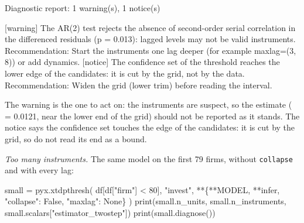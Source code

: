 \documentclass[
  10.5pt,
  a4paper,
]{article}
\newenvironment{Shaded}{}{}
\newcommand{\BuiltInTok}[1]{\textcolor[rgb]{0.00,0.50,0.00}{#1}}
\newcommand{\DecValTok}[1]{\textcolor[rgb]{0.25,0.63,0.44}{#1}}
\newcommand{\NormalTok}[1]{#1}
\newcommand{\OperatorTok}[1]{\textcolor[rgb]{0.40,0.40,0.40}{#1}}
\newcommand{\StringTok}[1]{\textcolor[rgb]{0.25,0.44,0.63}{#1}}
\newcommand{\VariableTok}[1]{\textcolor[rgb]{0.10,0.09,0.49}{#1}}
\begin{document}
\begin{Shaded}
\begin{Highlighting}[]
\NormalTok{Diagnostic report: 1 warning(s), 1 notice(s)}

\NormalTok{[warning] The AR(2) test rejects the absence of second{-}order serial correlation in the differenced residuals (p = 0.013): lagged levels may not be valid instruments.}
\NormalTok{    Recommendation: Start the instruments one lag deeper (for example maxlag=(3, 8)) or add dynamics.}
\NormalTok{[notice] The confidence set of the threshold reaches the lower edge of the candidates: it is cut by the grid, not by the data.}
\NormalTok{    Recommendation: Widen the grid (lower trim) before reading the interval.}
\end{Highlighting}
\end{Shaded}

The warning is the one to act on: the instruments are suspect, so the
estimate ( = 0.0121, near the lower end of the grid) should not be
reported as it stands. The notice says the confidence set touches the
edge of the candidates: it is cut by the grid, so do not read its end as
a bound.

\emph{Too many instruments.} The same model on the first 79 firms,
without \texttt{collapse} and with every lag:

\begin{Shaded}
\begin{Highlighting}[]
\NormalTok{small }\OperatorTok{=}\NormalTok{ pyx.xtdpthresh(}
\NormalTok{    df[df[}\StringTok{"firm"}\NormalTok{] }\OperatorTok{\textless{}} \DecValTok{80}\NormalTok{], }\StringTok{"invest"}\NormalTok{, }\OperatorTok{**}\NormalTok{\{}\OperatorTok{**}\NormalTok{MODEL, }\OperatorTok{**}\NormalTok{infer, }\StringTok{"collapse"}\NormalTok{: }\VariableTok{False}\NormalTok{, }\StringTok{"maxlag"}\NormalTok{: }\VariableTok{None}\NormalTok{\}}
\NormalTok{)}
\BuiltInTok{print}\NormalTok{(small.n\_units, small.n\_instruments, small.scalars[}\StringTok{"estimator\_twostep"}\NormalTok{])}
\BuiltInTok{print}\NormalTok{(small.diagnose())}
\end{Highlighting}
\end{Shaded}
\end{document}
